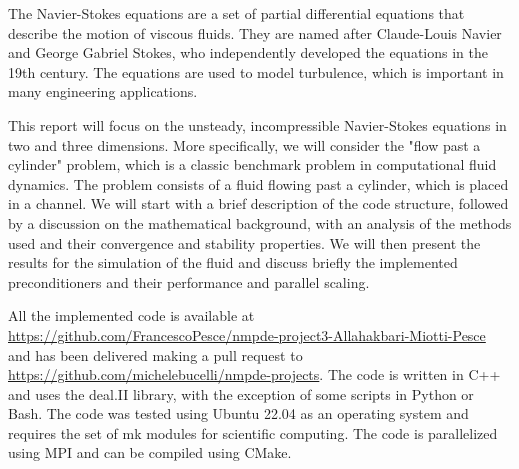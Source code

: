 The Navier-Stokes equations are a set of partial differential equations that describe the motion of viscous fluids. They are named after Claude-Louis Navier and George Gabriel Stokes, who independently developed the equations in the 19th century. The equations are used to model turbulence, which is important in many engineering applications.

This report will focus on the unsteady, incompressible Navier-Stokes equations in two and three dimensions. More specifically, we will consider the "flow past a cylinder" problem, which is a classic benchmark problem in computational fluid dynamics. The problem consists of a fluid flowing past a cylinder, which is placed in a channel. We will start with a brief description of the code structure, followed by a discussion on the mathematical background, with an analysis of the methods used and their convergence and stability properties. We will then present the results for the simulation of the fluid and discuss briefly the implemented preconditioners and their performance and parallel scaling.

All the implemented code is available at \url{https://github.com/FrancescoPesce/nmpde-project3-Allahakbari-Miotti-Pesce} and has been delivered making a pull request to \url{https://github.com/michelebucelli/nmpde-projects}. The code is written in C++ and uses the deal.II library, with the exception of some scripts in Python or Bash. The code was tested using Ubuntu 22.04 as an operating system and requires the set of mk modules for scientific computing. The code is parallelized using MPI and can be compiled using CMake.
